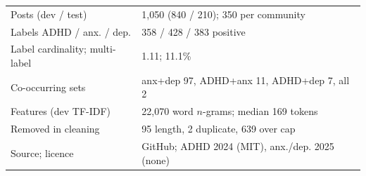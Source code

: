 \begin{tabular}{@{}ll@{}}
\toprule
Posts (dev / test) & 1,050 (840 / 210); 350 per community \\
Labels ADHD / anx. / dep. & 358 / 428 / 383 positive \\
Label cardinality; multi-label & 1.11; 11.1\% \\
Co-occurring sets & anx+dep 97, ADHD+anx 11, ADHD+dep 7, all 2 \\
Features (dev TF-IDF) & 22,070 word $n$-grams; median 169 tokens \\
Removed in cleaning & 95 length, 2 duplicate, 639 over cap \\
Source; licence & GitHub; ADHD 2024 (MIT), anx./dep. 2025 (none) \\
\bottomrule
\end{tabular}
